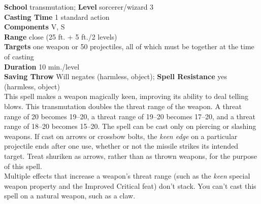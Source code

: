\textbf{School} transmutation; \textbf{Level} sorcerer/wizard 3\\
\textbf{Casting Time} 1 standard action\\
\textbf{Components} V, S\\
\textbf{Range} close (25 ft. + 5 ft./2 levels)\\
\textbf{Targets} one weapon or 50 projectiles, all of which must be together at the time of casting\\
\textbf{Duration} 10 min./level \\
\textbf{Saving Throw }Will negates (harmless, object); \textbf{Spell Resistance} yes (harmless, object)\\
This spell makes a weapon magically keen, improving its ability to deal telling blows. This transmutation doubles the threat range of the weapon. A threat range of 20 becomes 19--20, a threat range of 19--20 becomes 17--20, and a threat range of 18--20 becomes 15--20. The spell can be cast only on piercing or slashing weapons. If cast on arrows or crossbow bolts, the \textit{keen edge }on a particular projectile ends after one use, whether or not the missile strikes its intended target. Treat shuriken as arrows, rather than as thrown weapons, for the purpose of this spell.\\
Multiple effects that increase a weapon's threat range (such as the \textit{keen }special weapon property and the Improved Critical feat) don't stack. You can't cast this spell on a natural weapon, such as a claw.\\
